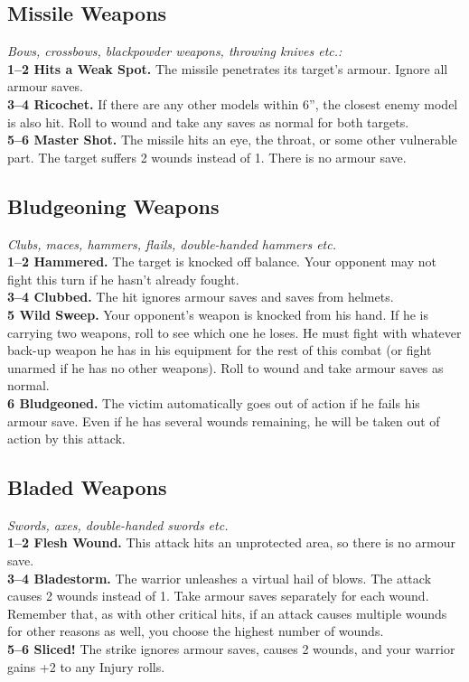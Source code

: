 \subsection*{Missile Weapons}
\textit{Bows, crossbows, blackpowder weapons, throwing knives etc.:}\\
\textbf{1–2 Hits a Weak Spot.} The missile penetrates its target’s armour. Ignore all armour saves.\\
\textbf{3–4 Ricochet.} If there are any other models within 6”, the closest enemy model is also hit. Roll to wound and take any saves as normal for both targets.\\
\textbf{5–6 Master Shot.} The missile hits an eye, the throat, or some other vulnerable part. The target suffers 2 wounds instead of 1. There is no armour save.

\subsection*{Bludgeoning Weapons}
\textit{Clubs, maces, hammers, flails, double-handed hammers etc.}\\
\textbf{1–2 Hammered.} The target is knocked off balance. Your opponent may not fight this turn if he hasn’t already fought.\\
\textbf{3–4 Clubbed.} The hit ignores armour saves and saves from helmets.\\
\textbf{5 Wild Sweep.} Your opponent’s weapon is knocked from his hand. If he is carrying two weapons, roll to see which one he loses. He must fight with whatever back-up weapon he has in his equipment for the rest of this combat (or fight unarmed if he has no other weapons). Roll to wound and take armour saves as normal.\\
\textbf{6 Bludgeoned.} The victim automatically goes out of action if he fails his armour save. Even if he has several wounds remaining, he will be taken out of action by this attack.

\subsection*{Bladed Weapons}
\textit{Swords, axes, double-handed swords etc.}\\
\textbf{1–2 Flesh Wound.} This attack hits an unprotected area, so there is no armour save.\\
\textbf{3–4 Bladestorm.} The warrior unleashes a virtual hail of blows. The attack causes 2 wounds instead of 1. Take armour saves separately for each wound. Remember that, as with other critical hits, if an attack causes multiple wounds for other reasons as well, you choose the highest number of wounds.\\
\textbf{5–6 Sliced!} The strike ignores armour saves, causes 2 wounds, and your warrior gains +2 to any Injury rolls.

